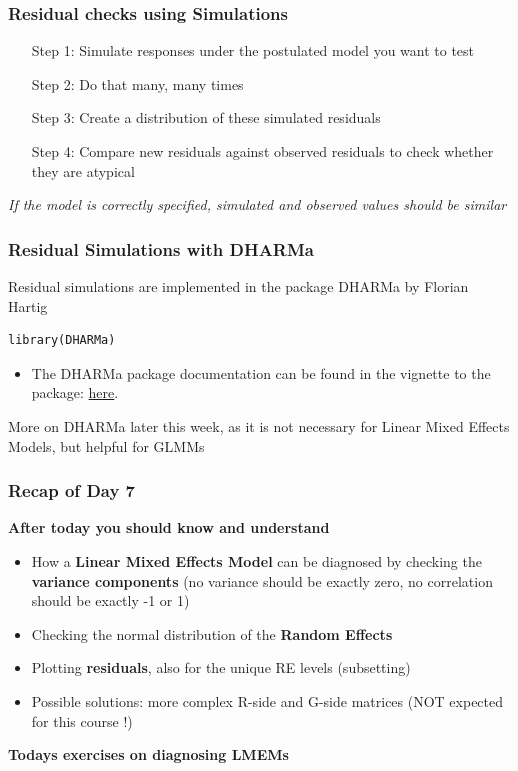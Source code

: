 \documentclass{beamer}
\begin{document}
\begin{frame}[fragile]
    \frametitle{Residual checks using Simulations}
    \begin{itemize}
        \item[Step 1:] Simulate responses under the postulated model you want to test
        \item[Step 2:] Do that many, many times
        \item[Step 3:] Create a distribution of these simulated residuals
        \item[Step 4:] Compare new residuals against observed residuals to check whether they are atypical
    \end{itemize}
    \vspace{0.3cm}

    \textit{If the model is correctly specified, simulated and observed values should be similar}
\end{frame}

\begin{frame}[fragile]
    \frametitle{Residual Simulations with DHARMa}
    Residual simulations are implemented in the package DHARMa by Florian Hartig
    \begin{Verbatim}
library(DHARMa)        
    \end{Verbatim}
    \vspace{0.3cm}
    
    \begin{itemize}
        \item The DHARMa package documentation can be found in the vignette to the package: \href{https://cran.r-project.org/web/packages/DHARMa/vignettes/DHARMa.html}{here}.
    \end{itemize}
    \vspace{0.3cm}
    
    More on DHARMa later this week, as it is not necessary for Linear Mixed Effects Models, but helpful for GLMMs
\end{frame}

\begin{frame}
    \frametitle{Recap of Day 7}
    \textbf{After today you should know and understand}
    \begin{itemize}
        \item How a \textbf{Linear Mixed Effects Model} can be diagnosed by checking the \textbf{variance components} (no variance should be exactly zero, no correlation should be exactly -1 or 1)
        \item Checking the normal distribution of the \textbf{Random Effects}
        \item Plotting \textbf{residuals}, also for the unique RE levels (subsetting)
        \item Possible solutions: more complex R-side and G-side matrices (NOT expected for this course !)
    \end{itemize}
    \vspace{0.3cm}
    \textbf{Todays exercises on diagnosing LMEMs}
\end{frame}
\end{document}
